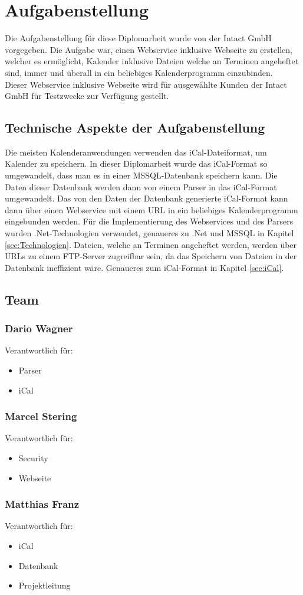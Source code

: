 \chapter{Aufgabenstellung}
\label{sec:Aufgabenstellung}
Die Aufgabenstellung für diese Diplomarbeit wurde von der Intact GmbH vorgegeben. Die Aufgabe war, einen Webservice inklusive Webseite zu erstellen, welcher es ermöglicht, Kalender inklusive Dateien welche an Terminen angeheftet sind, immer und überall in ein beliebiges Kalenderprogramm einzubinden. \\
Dieser Webservice inklusive Webseite wird für ausgewählte Kunden der Intact GmbH für Testzwecke zur Verfügung gestellt. \\

\section{Technische Aspekte der Aufgabenstellung}
\label{sec:TechnischeAspekteDerAufgabenstellung}
Die meisten Kalenderanwendungen verwenden das iCal-Dateiformat, um Kalender zu speichern. In dieser Diplomarbeit wurde das iCal-Format so umgewandelt, dass man es in einer MSSQL-Datenbank speichern kann. Die Daten dieser Datenbank werden dann von einem Parser in das iCal-Format umgewandelt. Das von den Daten der Datenbank generierte iCal-Format kann dann über einen Webservice mit einem URL in ein beliebiges Kalenderprogramm eingebunden werden. Für die Implementierung des Webservices und des Parsers wurden .Net-Technologien verwendet, genaueres zu .Net und MSSQL in Kapitel \ref{sec:Technologien}.  Dateien, welche an Terminen angeheftet werden, werden über URLs zu einem FTP-Server zugreifbar sein, da das Speichern von Dateien in der Datenbank ineffizient wäre. Genaueres zum iCal-Format in Kapitel \ref{sec:iCal}.
\pagebreak

\section{Team}
\label{sec:Team}
	\subsection*{Dario Wagner}
		Verantwortlich für: 
		\begin{itemize}
			\item Parser
			\item iCal
		\end{itemize}
	\subsection*{Marcel Stering}
		Verantwortlich für: 
		\begin{itemize}
			\item Security
			\item Webseite
		\end{itemize}
	\subsection*{Matthias Franz}
		Verantwortlich für: 
		\begin{itemize}
			\item iCal
			\item Datenbank
			\item Projektleitung
		\end{itemize}	
\pagebreak			